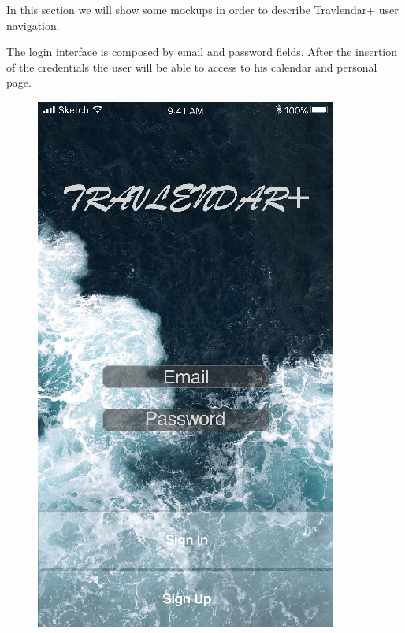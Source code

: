 In this section we will show some mockups in order to describe Travlendar+ user navigation.

The login interface is composed by email and password fields. After the insertion of the credentials the user will be able to access to his calendar and personal page.
\begin{figure}[H]
	\centering
	\includegraphics[scale=0.23]{Images/Interface/Login/1_login_form}
	\hspace{0.5cm}

\end{figure}
